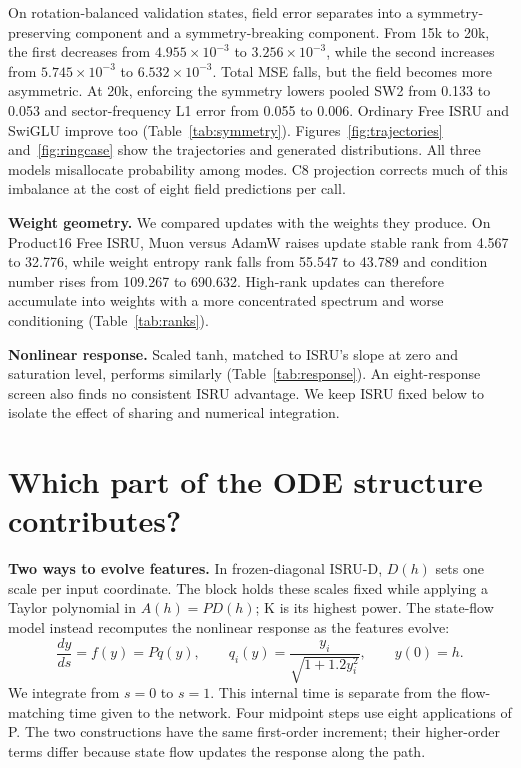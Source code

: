 \documentclass[11pt]{article}
\begin{document}
On rotation-balanced validation states, field error separates into a
symmetry-preserving component and a symmetry-breaking component. From 15k to
20k, the first decreases from $4.955\times10^{-3}$ to $3.256\times10^{-3}$,
while the second increases from $5.745\times10^{-3}$ to $6.532\times10^{-3}$.
Total MSE falls, but the field becomes more asymmetric. At 20k, enforcing the
symmetry lowers pooled SW2 from 0.133 to 0.053 and sector-frequency L1 error
from 0.055 to 0.006. Ordinary Free ISRU and SwiGLU improve too
(Table~\ref{tab:symmetry}). Figures~\ref{fig:trajectories} and~\ref{fig:ringcase}
show the trajectories and generated distributions. All three models misallocate
probability among modes. C8 projection corrects much of this imbalance at the
cost of eight field predictions per call.

\textbf{Weight geometry.} We compared updates with the weights they produce.
On Product16 Free ISRU, Muon versus AdamW raises update stable rank from
4.567 to 32.776, while weight entropy rank falls from 55.547 to 43.789 and
condition number rises from 109.267 to 690.632. High-rank updates can therefore
accumulate into weights with a more concentrated spectrum and worse
conditioning (Table~\ref{tab:ranks}).

\textbf{Nonlinear response.} Scaled tanh, matched to ISRU's slope at zero and
saturation level, performs similarly (Table~\ref{tab:response}). An
eight-response screen also finds no consistent ISRU advantage. We keep ISRU
fixed below to isolate the effect of sharing and numerical integration.

\newpage
\section{Which part of the ODE structure contributes?}
\textbf{Two ways to evolve features.} In frozen-diagonal ISRU-D, $D(h)$ sets
one scale per input coordinate. The block holds these scales fixed while
applying a Taylor polynomial in $A(h)=PD(h)$; K is its highest power.
The state-flow model instead recomputes the nonlinear response as the features
evolve:
\begin{equation}
\frac{dy}{ds}=f(y)=Pq(y),\qquad
q_i(y)=\frac{y_i}{\sqrt{1+1.2y_i^2}},\qquad y(0)=h.
\label{eq:stateflow}
\end{equation}
We integrate from $s=0$ to $s=1$. This internal time is separate from the
flow-matching time given to the network. Four midpoint steps use eight
applications of P. The two constructions have the same first-order increment;
their higher-order terms differ because state flow updates the response along
the path.
\end{document}

